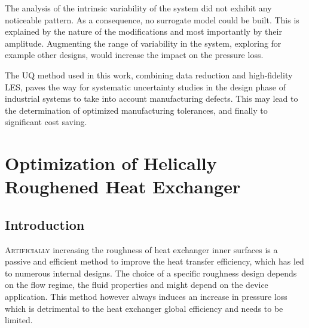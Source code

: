 The analysis of the intrinsic variability of the system did not exhibit any noticeable pattern. As a consequence, no surrogate model could be built. This is explained by the nature of the modifications and most importantly by their amplitude. Augmenting the range of variability in the system, exploring for example other designs, would increase the impact on the pressure loss. %

The UQ method used in this work, combining data reduction and high-fidelity LES, paves the way for systematic uncertainty studies in the design phase of industrial systems to take into account manufacturing defects. This may lead to the determination of optimized manufacturing tolerances, and finally to significant cost saving.

\chapter{Optimization of Helically Roughened Heat Exchanger}\label{chap:optim}

\section{Introduction}

\lettrine{A}{rtificially} increasing the roughness of heat exchanger inner surfaces is a passive and efficient method to improve the heat transfer efficiency, which has led to numerous internal designs. The choice of a specific roughness design depends on the flow regime, the fluid properties and might depend on the device application. This method however always induces an increase in pressure loss which is detrimental to the heat exchanger global efficiency and needs to be limited.\\

